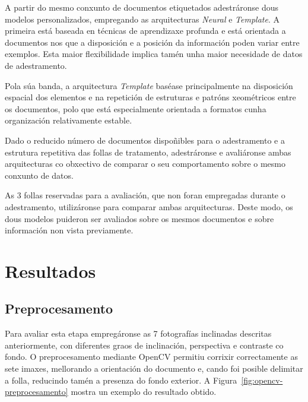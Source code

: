 A partir do mesmo conxunto de documentos etiquetados adestráronse dous modelos personalizados, empregando as arquitecturas \textit{Neural} e \textit{Template}. A primeira está baseada en técnicas de aprendizaxe profunda e está orientada a documentos nos que a disposición e a posición da información poden variar entre exemplos. Esta maior flexibilidade implica tamén unha maior necesidade de datos de adestramento.

Pola súa banda, a arquitectura \textit{Template} baséase principalmente na disposición espacial dos elementos e na repetición de estruturas e patróns xeométricos entre os documentos, polo que está especialmente orientada a formatos cunha organización relativamente estable.

Dado o reducido número de documentos dispoñibles para o adestramento e a estrutura repetitiva das follas de tratamento, adestráronse e avaliáronse ambas arquitecturas co obxectivo de comparar o seu comportamento sobre o mesmo conxunto de datos.

As 3 follas reservadas para a avaliación, que non foran empregadas durante o adestramento, utilizáronse para comparar ambas arquitecturas. Deste modo, os dous modelos puideron ser avaliados sobre os mesmos documentos e sobre información non vista previamente.


\section{Resultados}
\label{sec:resultados-procesamento}

\subsection{Preprocesamento}

Para avaliar esta etapa empregáronse as 7 fotografías inclinadas descritas anteriormente, con diferentes graos de inclinación, perspectiva e contraste co fondo. O preprocesamento mediante OpenCV permitiu corrixir correctamente as sete imaxes, mellorando a orientación do documento e, cando foi posible delimitar a folla, reducindo tamén a presenza do fondo exterior. A Figura~\ref{fig:opencv-preprocesamento} mostra un exemplo do resultado obtido.


